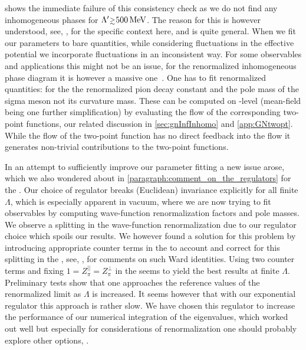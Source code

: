  shows the immediate failure of this consistency check as we do not find any inhomogeneous phases for $\Lambda'\smallergtrsim 500\,\MeV$. The reason for this is however understood, see, \eg{},  for the specific context here, and is quite general. When we fit our parameters to bare quantities, while considering fluctuations in the effective potential we incorporate fluctuations in an inconsistent way. For some observables and applications this might not be an issue, for the renormalized inhomogeneous phase diagram it is however a massive one~\cite{PhysRevD.94.034023,Carignano:2014jla}. One has to fit renormalized quantities: for the \qmm{} the renormalized pion decay constant and the pole mass of the sigma meson not its curvature mass. These can be computed on \lpa{}-level (mean-field being one further simplification) by evaluating the flow of the corresponding two-point functions, \cf{} our related discussion in \cref{sec:gnInfInhomo} and \cref{app:GNtwopt}. While the flow of the two-point function has no direct feedback into the \lpa{} flow it generates non-trivial contributions to the two-point functions.

In an attempt to sufficiently improve our parameter fitting a new issue arose, which we also wondered about in \cref{paragraph:comment_on_the_regulators} for the \gnym{}.
Our choice of regulator breaks (Euclidean) \Poincare{} invariance explicitly for all finite $\Lambda$, which is especially apparent in vacuum, where we are now trying to fit observables by computing wave-function renormalization factors and pole masses. We observe a splitting in the wave-function renormalization due to our regulator choice which spoils our results. We however found a solution for this problem by introducing appropriate counter terms in the \uv{} to account and correct for this splitting in the \ir{}, see, \eg{},  for comments on such Ward identities.
Using two counter terms and fixing $1=Z_\pi^{||}=Z_\pi^\perp$ in the \ir{} seems to yield the best results at finite $\Lambda$. Preliminary tests show that one approaches the reference values of the renormalized limit as $\Lambda$ is increased. It seems however that with our exponential regulator this approach is rather slow. We have chosen this regulator to increase the performance of our numerical integration of the \cdw{} eigenvalues, which worked out well but especially for considerations of renormalization one should probably explore other options, \cf{} .

